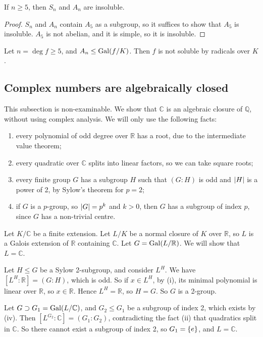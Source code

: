 \begin{proposition}
	If \( n \geq 5 \), then \( S_n \) and \( A_n \) are insoluble.
\end{proposition}
\begin{proof}
	\( S_n \) and \( A_n \) contain \( A_5 \) as a subgroup, so it suffices to show that \( A_5 \) is insoluble.
	\( A_5 \) is not abelian, and it is simple, so it is insoluble.
\end{proof}
\begin{corollary}
	Let \( n = \deg f \geq 5 \), and \( A_n \leq \operatorname{Gal}(f/K) \).
	Then \( f \) is not soluble by radicals over \( K \).
\end{corollary}

\subsection{Complex numbers are algebraically closed}
This subsection is non-examinable.
We show that \( \mathbb C \) is an algebraic closure of \( \mathbb Q \), without using complex analysis.
We will only use the following facts:
\begin{enumerate}
	\item every polynomial of odd degree over \( \mathbb R \) has a root, due to the intermediate value theorem;
	\item every quadratic over \( \mathbb C \) splits into linear factors, so we can take square roots;
	\item every finite group \( G \) has a subgroup \( H \) such that \( (G:H) \) is odd and \( \abs{H} \) is a power of 2, by Sylow's theorem for \( p = 2 \);
	\item if \( G \) is a \( p \)-group, so \( \abs{G} = p^k \) and \( k > 0 \), then \( G \) has a subgroup of index \( p \), since \( G \) has a non-trivial centre.
\end{enumerate}
Let \( K / \mathbb C \) be a finite extension.
Let \( L / K \) be a normal closure of \( K \) over \( \mathbb R \), so \( L \) is a Galois extension of \( \mathbb R \) containing \( \mathbb C \).
Let \( G = \operatorname{Gal}(L/\mathbb R) \).
We will show that \( L = \mathbb C \).

Let \( H \leq G \) be a Sylow 2-subgroup, and consider \( L^H \).
We have \( [L^H:\mathbb R] = (G:H) \), which is odd.
So if \( x \in L^H \), by (i), its minimal polynomial is linear over \( \mathbb R \), so \( x \in \mathbb R \).
Hence \( L^H = \mathbb R \), so \( H = G \).
So \( G \) is a 2-group.

Let \( G \supset G_1 = \operatorname{Gal}(L/\mathbb C) \), and \( G_2 \leq G_1 \) be a subgroup of index 2, which exists by (iv).
Then \( [L^{G_2}:\mathbb C] = (G_1 : G_2) \), contradicting the fact (ii) that quadratics split in \( \mathbb C \).
So there cannot exist a subgroup of index 2, so \( G_1 = \qty{e} \), and \( L = \mathbb C \).

